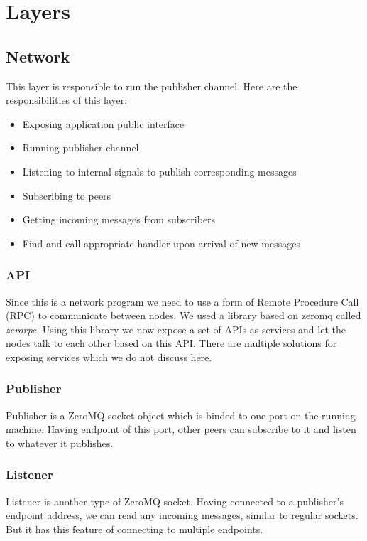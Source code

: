 \section{Layers}
\subsection{Network}
This layer is responsible to run the publisher channel. 
Here are the responsibilities of this layer:

\begin{itemize}
\item Exposing application public interface
\item Running publisher channel
\item Listening to internal signals to publish corresponding messages
\item Subscribing to peers
\item Getting incoming messages from subscribers 
\item Find and call appropriate handler upon arrival of new messages
\end{itemize}

\subsubsection{API}
Since this is a network program we need to use a form of Remote Procedure Call (RPC) 
to communicate between nodes. We used a library based on zeromq 
called \textit{zerorpc}. Using this library we now expose a set of APIs as services and let the nodes talk to 
each other based on this API. There are multiple solutions for exposing services which we do not discuss here.

\subsubsection{Publisher}
Publisher is a ZeroMQ socket object which is binded to one port on the running machine. 
Having endpoint of this port, other peers can subscribe to it and listen to whatever it publishes.

\subsubsection{Listener}
Listener is another type of ZeroMQ socket. 
Having connected to a publisher's endpoint address, 
we can read any incoming messages, similar to regular sockets.
But it has this feature of connecting to multiple endpoints.

